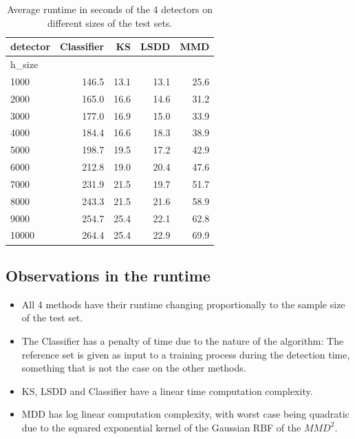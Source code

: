 \documentclass[12pt]{report}
\begin{document}
\begin{table}[h]
\begin{tabular}{|l|r|r|r|r|}
    \toprule
    detector &  Classifier &   KS &  LSDD &  MMD \\ \midrule
    h\_size &             &      &       &      \\ \midrule
    \midrule
    1000   &       146.5 & 13.1 &  13.1 & 25.6 \\ \midrule
    2000   &       165.0 & 16.6 &  14.6 & 31.2 \\ \midrule
    3000   &       177.0 & 16.9 &  15.0 & 33.9 \\ \midrule
    4000   &       184.4 & 16.6 &  18.3 & 38.9 \\ \midrule
    5000   &       198.7 & 19.5 &  17.2 & 42.9 \\ \midrule
    6000   &       212.8 & 19.0 &  20.4 & 47.6 \\ \midrule
    7000   &       231.9 & 21.5 &  19.7 & 51.7 \\ \midrule
    8000   &       243.3 & 21.5 &  21.6 & 58.9 \\ \midrule
    9000   &       254.7 & 25.4 &  22.1 & 62.8 \\ \midrule
    10000  &       264.4 & 25.4 &  22.9 & 69.9 \\ \midrule
    \bottomrule
\end{tabular}
\caption{Average runtime in seconds of the 4 detectors on different sizes of the test sets.}
\label{tab:runtime}
\end{table}

\subsection{Observations in the runtime}

\begin{itemize}
    \item All 4 methods have their runtime changing proportionally to the sample size of the test set.
    \item The Classifier has a penalty of time due to the nature of the algorithm: The reference set is given as input to a training process during the detection time, something that is not the case on the other methods.
    \item KS, LSDD and Classifier have a linear time computation complexity.
    \item MDD has log linear computation complexity, with worst case being quadratic due to the squared exponential kernel of the Gaussian RBF of the \(MMD^{2}\).
\end{itemize}
\end{document}
